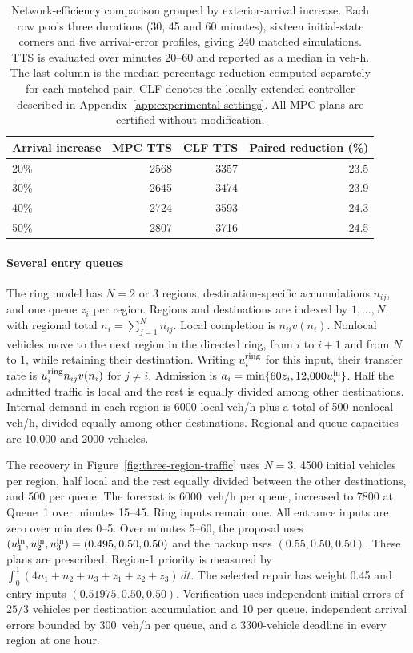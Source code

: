\documentclass[final]{cas-sc}
\theoremstyle{definition}
\theoremstyle{plain}
\theoremstyle{definition}
\theoremstyle{plain}
\begin{document}
\begin{table}[pos=!htb]
\centering\small
\caption{Network-efficiency comparison grouped by exterior-arrival
increase. Each row pools three durations (30, 45 and 60 minutes),
sixteen initial-state corners and five arrival-error profiles, giving
240 matched simulations. TTS is evaluated over minutes 20--60 and
reported as a median in veh-h. The last column is the median percentage
reduction computed separately for each matched pair. CLF denotes the
locally extended controller described in Appendix~\ref{app:experimental-settings}.
All MPC plans are certified without modification.}
\label{tab:arrival-efficiency}
\begin{tabularx}{\linewidth}{@{}Xrrr@{}}
\toprule
Arrival increase & MPC TTS & CLF TTS & Paired reduction (\%)\\
\midrule
20\% & 2568 & 3357 & 23.5\\
30\% & 2645 & 3474 & 23.9\\
40\% & 2724 & 3593 & 24.3\\
50\% & 2807 & 3716 & 24.5\\
\bottomrule
\end{tabularx}
\end{table}

\paragraph{Several entry queues}
\label{app:network-transfer}
The ring model has $N=2$ or $3$ regions, destination-specific
accumulations $n_{ij}$, and one queue $z_i$ per region. Regions and
destinations are indexed by $1,\ldots,N$, with regional total
$n_i=\sum_{j=1}^N n_{ij}$. Local completion is $n_{ii}v(n_i)$.
Nonlocal vehicles move to the next region in the directed ring,
from $i$ to $i+1$ and from $N$ to $1$, while retaining their destination.
Writing $u_i^{\rm ring}$ for this input, their transfer rate is
$u_i^{\rm ring}n_{ij}v(n_i)$ for $j\ne i$. Admission is
$a_i=\min\{60z_i,12{,}000u_i^{\rm in}\}$. Half the admitted traffic
is local and the rest is equally divided among other destinations.
Internal demand in each region is 6000 local veh/h plus a total of
500 nonlocal veh/h, divided equally among other destinations.
Regional and queue capacities are 10,000 and 2000 vehicles.

The recovery in Figure~\ref{fig:three-region-traffic} uses $N=3$,
4500 initial vehicles per region, half local and the rest equally
divided between the other destinations, and 500 per queue. The
forecast is 6000~veh/h per queue, increased to 7800 at Queue~1 over
minutes 15--45. Ring inputs remain one. All entrance inputs are zero
over minutes 0--5. Over minutes 5--60, the proposal uses
$(u_1^{\rm in},u_2^{\rm in},u_3^{\rm in})=(0.495,0.50,0.50)$ and the
backup uses $(0.55,0.50,0.50)$. These plans are prescribed. Region-1
priority is measured by
$\int_0^1(4n_1+n_2+n_3+z_1+z_2+z_3)\,dt$.
The selected repair has weight 0.45 and entry inputs
$(0.51975,0.50,0.50)$. Verification uses independent initial errors
of $25/3$ vehicles per destination accumulation and 10 per queue,
independent arrival errors bounded by 300~veh/h per queue, and a
3300-vehicle deadline in every region at one hour.
\end{document}
